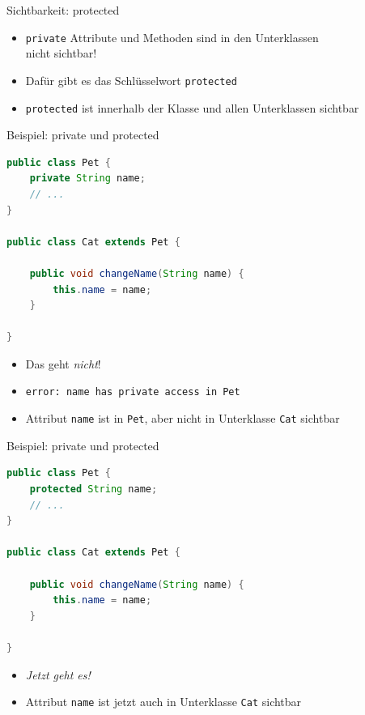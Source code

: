 \documentclass[18pt]{beamer}
\begin{document}
\begin{frame}{Sichtbarkeit: protected}

    \begin{itemize}
        \item \texttt{private} Attribute und Methoden sind in den Unterklassen\\ \alert{nicht} sichtbar!
        \item Dafür gibt es das Schlüsselwort \texttt{protected}
        \item \texttt{protected} ist innerhalb der Klasse und allen Unterklassen sichtbar
    \end{itemize}
\end{frame}

\begin{frame}[fragile]{Beispiel: private und protected}
    \begin{exampleblock}{}
        \begin{lstlisting}[language=Java,basicstyle=\scriptsize]
public class Pet {
    private String name;
    // ...
}

public class Cat extends Pet {

    public void changeName(String name) {
        this.name = name;
    }

}
        \end{lstlisting}
    \end{exampleblock}

    \begin{itemize}
        \item Das geht \textit{nicht}!
        \item \texttt{error: name has private access in Pet}
        \item Attribut \texttt{name} ist in \texttt{Pet}, aber nicht in Unterklasse \texttt{Cat} sichtbar
    \end{itemize}
\end{frame}

\begin{frame}[fragile]{Beispiel: private und protected}
    \begin{exampleblock}{}
        \begin{lstlisting}[language=Java,basicstyle=\scriptsize]
public class Pet {
    protected String name;
    // ...
}

public class Cat extends Pet {

    public void changeName(String name) {
        this.name = name;
    }

}
        \end{lstlisting}
    \end{exampleblock}

    \begin{itemize}
        \item \textit{Jetzt geht es!}
        \item Attribut \texttt{name} ist jetzt auch in Unterklasse \texttt{Cat} sichtbar
    \end{itemize}
\end{frame}
\end{document}
